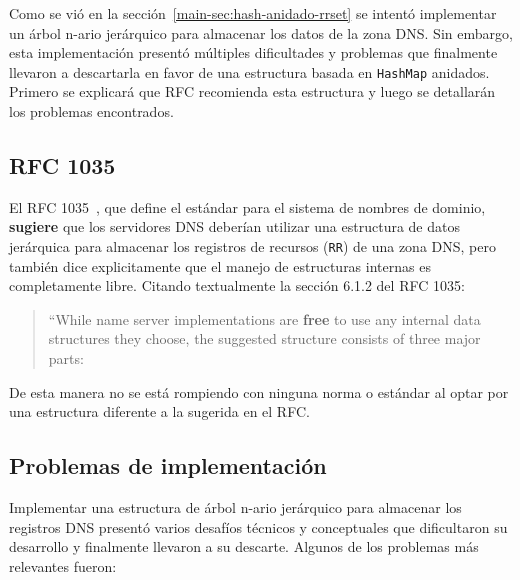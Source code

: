 Como se vió en la sección~\ref{main-sec:hash-anidado-rrset} se intentó implementar un árbol n-ario jerárquico para almacenar los datos de la zona DNS. Sin embargo, 
esta implementación presentó múltiples dificultades y problemas que finalmente llevaron a descartarla en favor de una estructura basada en \texttt{HashMap} anidados. Primero se 
explicará que RFC recomienda esta estructura y luego se detallarán los problemas encontrados.

\subsection{RFC 1035}

El RFC 1035~\cite{RFC1035}, que define el estándar para el sistema de nombres de dominio, \textbf{sugiere} que los servidores DNS deberían utilizar una estructura de datos jerárquica para almacenar
los registros de recursos (\texttt{RR}) de una zona DNS, pero también dice explicitamente que el manejo de estructuras internas es completamente libre. Citando textualmente la sección 6.1.2 del RFC 1035:

\begin{quote}
   ``While name server implementations are \textbf{free} to use any internal data
    structures they choose, the suggested structure consists of three major
    parts:\\
\end{quote}

De esta manera no se está rompiendo con ninguna norma o estándar al optar por una estructura diferente a la sugerida en el RFC.

\subsection{Problemas de implementación}

Implementar una estructura de árbol n-ario jerárquico para almacenar los registros DNS presentó varios desafíos técnicos y conceptuales que dificultaron su desarrollo y
finalmente llevaron a su descarte. Algunos de los problemas más relevantes fueron:

